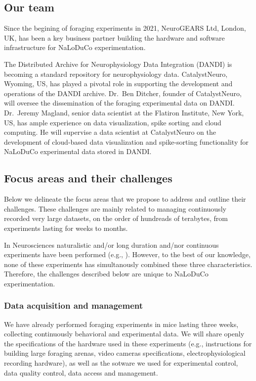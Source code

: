 \subsection{Our team}

Since the begining of foraging experiments in 2021, NeuroGEARS Ltd, London, UK,
has been a key business partner building the hardware and software
infrastructure for NaLoDuCo experimentation.

The Distributed Archive for Neurophysiology Data Integration (DANDI) is
becoming a standard repository for neurophysiology data.
%
CatalystNeuro, Wyoming, US, has played a pivotal role in supporting the
development and operations of the DANDI archive.
%
Dr.~Ben Ditcher, founder of CatalystNeuro, will oversee the dissemination of
the foraging experimental data on DANDI.
%
Dr.~Jeremy Magland, senior data scientist at the Flatiron Institute, New York,
US, has ample experience on data visualization, spike sorting and cloud
computing. He will supervise a data scientist at CatalystNeuro on the
development of cloud-based data visualization and spike-sorting functionality
for NaLoDuCo experimental data stored in DANDI.

\subsection{Focus areas and their challenges}

Below we delineate the focus areas that we propose to address and outline their
challenges.
%
These challenges are mainly related to managing continuously recorded very
large datasets, on the order of hundreads of terabytes, from experiments
lasting for weeks to months.

In Neurosciences naturalistic and/or long duration and/nor continuous
experiments have been performed (e.g., ). However, to the best of our
knowledge, none of these experiments has simultanously combined these three
characteristics. Therefore, the challenges described below are unique to
NaLoDuCo experimentation.

\subsubsection{Data acquisition and management}

We have already performed foraging experiments in mice lasting three weeks,
collecting continuously behavioral and experimental data.
%
We will share openly the specifications of the hardware used in these
experiments (e.g., instructions for building large foraging arenas, video
cameras specifications, electrophysiological recording hardware), as well as
the sotware we used for experimental control, data quality control, data access
and management.

